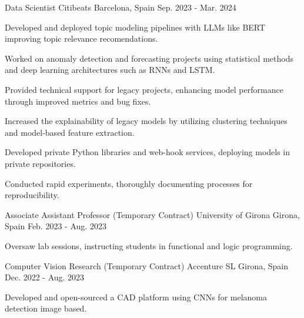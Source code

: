 

\begin{cventries}


  \cventry
  {Data Scientist} %
  {Citibeats} %
  {Barcelona, Spain} %
  {Sep. 2023 - Mar. 2024} %
  {
  \begin{cvitems}
\item {Developed and deployed topic modeling pipelines with LLMs like BERT improving topic relevance recomendations.}
\item {Worked on anomaly detection and forecasting projects using statistical methods and deep learning architectures
  such as RNNs and LSTM.}
\item {Provided technical support for legacy projects, enhancing model performance through improved metrics and bug fixes.}
\item {Increased the explainability of legacy models by utilizing clustering techniques and model-based feature extraction.}
\item {Developed private Python libraries and web-hook services, deploying models in private repositories.}
\item {Conducted rapid experiments, thoroughly documenting processes for reproducibility.}
  \end{cvitems}
}


  \cventry
  {Associate Assistant Professor (Temporary Contract)} %
  {University of Girona} %
  {Girona, Spain} %
  {Feb. 2023 - Aug. 2023} %
  {
    \begin{cvitems} %
    \item {Oversaw lab sessions, instructing students in functional and logic programming.}
    \end{cvitems}
    }


    \cventry
    {Computer Vision Research (Temporary Contract)} %
    {Accenture SL} %
    {Girona, Spain} %
    {Dec. 2022 - Aug. 2023} %
    {
    \begin{cvitems}
    \item {Developed and open-sourced a CAD platform using CNNs for melanoma detection image based.}
    \end{cvitems}
    }


\end{cventries}
